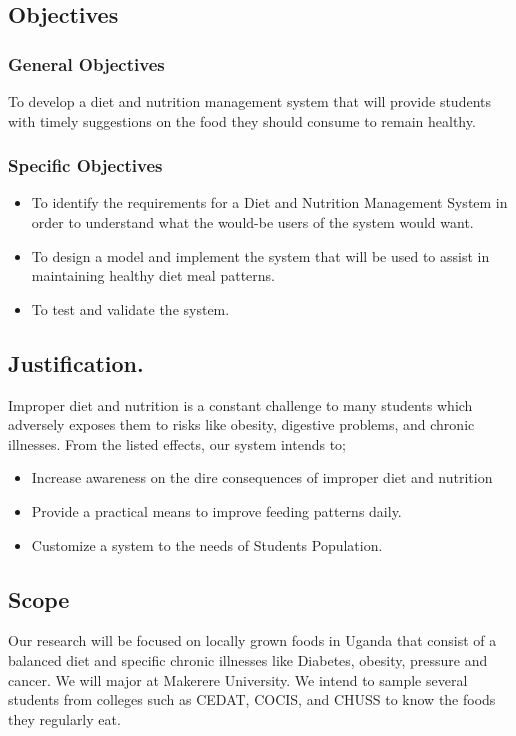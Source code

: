 \documentclass{article}
\begin{document}
\subsection{Objectives}
\subsubsection{General Objectives}

To develop a diet and nutrition management system that will provide students with timely suggestions on the food they should consume to remain healthy. 

\subsubsection{Specific Objectives}

\begin{itemize}
\item To identify the requirements for a Diet and Nutrition Management System in order to understand what the would-be users of the system would want.

\item To design a model and implement the system that will be used to assist in maintaining healthy diet meal patterns.

\item To test and validate the system.  

\end{itemize}


\subsection{Justification.}
Improper diet and nutrition is a constant challenge to many students which adversely exposes them to risks like obesity, digestive problems, and chronic illnesses. From the listed effects, our system intends to; 
\begin{itemize}
  \item Increase awareness on the dire consequences of improper diet and nutrition
  \item Provide a practical means to improve feeding patterns daily. 
  \item Customize a system to the needs of Students Population. 

\end{itemize}

\subsection{Scope}
Our research will be focused on locally grown foods in Uganda that consist of a balanced diet and specific chronic illnesses like Diabetes, obesity, pressure and cancer. We will major at Makerere University. We intend to sample several students from colleges such as CEDAT, COCIS, and CHUSS to know the foods they regularly eat.
\end{document}
